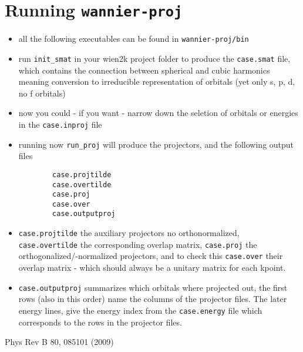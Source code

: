 \documentclass[a4paper,bibtotocnumbered]{scrartcl}
\begin{document}
\section{Running \texttt{wannier-proj}}
\begin{itemize}
	\item all the following executables can be found in \texttt{wannier-proj/bin}
	\item run \texttt{init\_smat} in your wien2k project folder to produce the \texttt{case.smat}
	file, which contains the connection between spherical and cubic harmonics meaning
	conversion to irreducible representation of orbitals (yet only s, p, d, no f orbitals)
	\item now you could - if you want - narrow down the seletion of orbitals or energies
	in the \texttt{case.inproj} file
	\item running now \texttt{run\_proj} will produce the projectors, and the following output files
	\begin{verbatim}
		case.projtilde
		case.overtilde
		case.proj
		case.over
		case.outputproj
	\end{verbatim}
	\item \texttt{case.projtilde} the auxiliary projectors no orthonormalized,
	\texttt{case.overtilde} the corresponding overlap matrix, \texttt{case.proj}
	the orthogonalized/-normalized projectors, and to check this \texttt{case.over}
	their overlap matrix - which should always be a unitary matrix for each kpoint.
	\item \texttt{case.outputproj} summarizes which orbitals where projected out,
	the first rows (also in this order) name the columns of the projector files. The
	later energy lines, give the energy index from the \texttt{case.energy} file
	which corresponds to the rows in the projector files.
\end{itemize}

\newpage
\begin{thebibliography}{99}
Phys Rev B 80, 085101 (2009)


\end{thebibliography}
\end{document}
